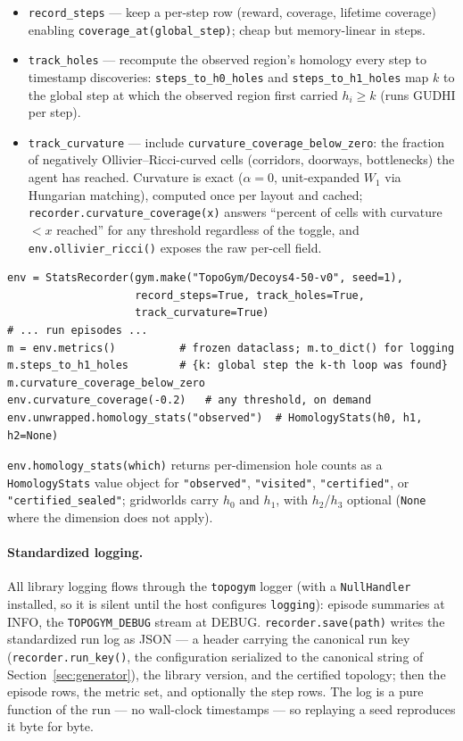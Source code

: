 \documentclass[11pt]{article}
\begin{document}
\begin{itemize}[leftmargin=2em, itemsep=1pt]
  \item \texttt{record\_steps} --- keep a per-step row (reward,
        coverage, lifetime coverage) enabling
        \texttt{coverage\_at(global\_step)}; cheap but memory-linear
        in steps.
  \item \texttt{track\_holes} --- recompute the observed region's
        homology every step to timestamp discoveries:
        \texttt{steps\_to\_h0\_holes} and
        \texttt{steps\_to\_h1\_holes} map $k$ to the global step at
        which the observed region first carried $h_i \ge k$ (runs
        GUDHI per step).
  \item \texttt{track\_curvature} --- include
        \texttt{curvature\_coverage\_below\_zero}: the fraction of
        negatively Ollivier--Ricci-curved cells (corridors, doorways,
        bottlenecks) the agent has reached. Curvature is exact
        ($\alpha = 0$, unit-expanded $W_1$ via Hungarian matching),
        computed once per layout and cached;
        \texttt{recorder.curvature\_coverage(x)} answers ``percent
        of cells with curvature $< x$ reached'' for any threshold
        regardless of the toggle, and \texttt{env.ollivier\_ricci()}
        exposes the raw per-cell field.
\end{itemize}

\begin{lstlisting}
env = StatsRecorder(gym.make("TopoGym/Decoys4-50-v0", seed=1),
                    record_steps=True, track_holes=True,
                    track_curvature=True)
# ... run episodes ...
m = env.metrics()          # frozen dataclass; m.to_dict() for logging
m.steps_to_h1_holes        # {k: global step the k-th loop was found}
m.curvature_coverage_below_zero
env.curvature_coverage(-0.2)   # any threshold, on demand
env.unwrapped.homology_stats("observed")  # HomologyStats(h0, h1, h2=None)
\end{lstlisting}

\texttt{env.homology\_stats(which)} returns per-dimension hole
counts as a \texttt{HomologyStats} value object for
\texttt{"observed"}, \texttt{"visited"}, \texttt{"certified"}, or
\texttt{"certified\_sealed"}; gridworlds carry $h_0$ and $h_1$, with
$h_2$/$h_3$ optional (\texttt{None} where the dimension does not
apply).

\paragraph{Standardized logging.} All library logging flows through
the \texttt{topogym} logger (with a \texttt{NullHandler} installed,
so it is silent until the host configures \texttt{logging}): episode
summaries at INFO, the \texttt{TOPOGYM\_DEBUG} stream at DEBUG.
\texttt{recorder.save(path)} writes the standardized run log as JSON
--- a header carrying the canonical run key
(\texttt{recorder.run\_key()}, the configuration serialized to the
canonical string of Section~\ref{sec:generator}), the library
version, and the certified topology; then the episode rows, the
metric set, and optionally the step rows. The log is a pure function
of the run --- no wall-clock timestamps --- so replaying a seed
reproduces it byte for byte.
\end{document}
